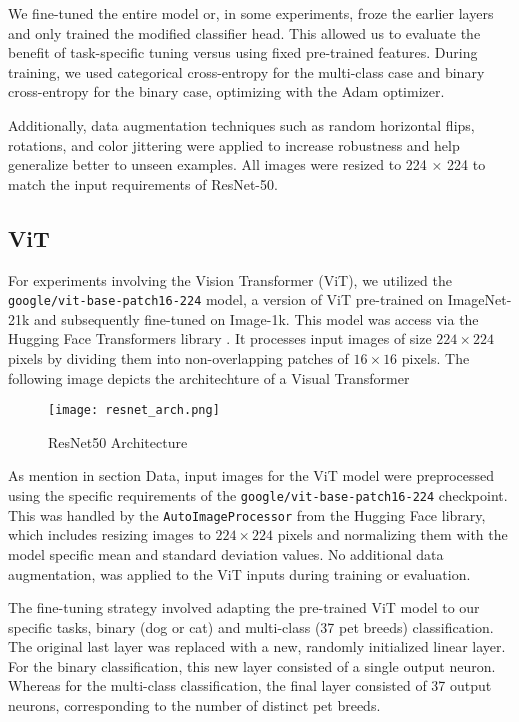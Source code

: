 \documentclass{article}
\begin{document}
We fine-tuned the entire model or, in some experiments, froze the earlier layers and only trained the modified classifier head. This allowed us to evaluate the benefit of task-specific tuning versus using fixed pre-trained features. During training, we used categorical cross-entropy for the multi-class case and binary cross-entropy for the binary case, optimizing with the Adam optimizer.

Additionally, data augmentation techniques such as random horizontal flips, rotations, and color jittering were applied to increase robustness and help generalize better to unseen examples. All images were resized to 224 × 224 to match the input requirements of ResNet-50.

\subsection{ViT}
For experiments involving the Vision Transformer (ViT), we utilized the \texttt{google/vit-base-patch16-224} model, a version of ViT pre-trained on ImageNet-21k and subsequently fine-tuned on Image-1k. This model was access via the Hugging Face Transformers library \citep{wolf-etal-2020-transformers}. It processes input images of size $224 \times 224$ pixels by dividing them into non-overlapping patches of $16 \times 16$ pixels. The following image depicts the architechture of a Visual Transformer

\begin{figure}[h]
    \centering
    \texttt{[image: resnet\_arch.png]}
    \caption{ResNet50 Architecture}
    \label{fig:resnet_architecture}
\end{figure}


As mention in section Data, input images for the ViT model were preprocessed using the specific requirements of the \texttt{google/vit-base-patch16-224} checkpoint. This was handled by the \texttt{AutoImageProcessor} from the Hugging Face library, which includes resizing images to $224 \times 224$ pixels and normalizing them with the model specific mean and standard deviation values. No additional data augmentation, was applied to the ViT inputs during training or evaluation.

The fine-tuning strategy involved adapting the pre-trained ViT model to our specific tasks, binary (dog or cat) and multi-class (37 pet breeds) classification. The original last layer was replaced with a new, randomly initialized linear layer. For the binary classification, this new layer consisted of a single output neuron. Whereas for the multi-class classification, the final layer consisted of 37 output neurons, corresponding to the number of distinct pet breeds.
\end{document}
